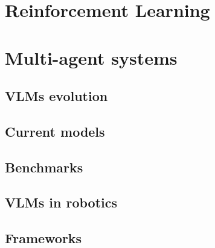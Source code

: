 
\section{Reinforcement Learning}

\section{Multi-agent systems}


\subsection{VLMs evolution}

\subsection{Current models}

\subsection{Benchmarks}

\subsection{VLMs in robotics}

\subsection{Frameworks}